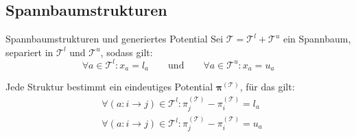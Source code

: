 \documentclass[accentcolor = tud11b, colorbacktitle, landscape, german, presentation, tudmathserif]{tudbeamer}
\renewcommand{\vec}[1]{\boldsymbol{\mathbf{#1}}}
\begin{document}
		\subsection{Spannbaumstrukturen}
			\begin{frame}{Spannbaumstrukturen und generiertes Potential}
				Sei \( \mathcal{T} = \mathcal{T}^l + \mathcal{T}^u \) ein Spannbaum, separiert in \( \mathcal{T}^l \) und \( \mathcal{T}^u \), sodass gilt:
				\begin{equation*}
					\forall a \in \mathcal{T}^l : x_a = l_a \qquad\text{und}\qquad \forall a \in \mathcal{T}^u : x_a = u_a
				\end{equation*}
				
				\vspace{0.5cm}
				Jede Struktur bestimmt ein eindeutiges Potential \( \vec{\pi}^{(\mathcal{T})} \), für das gilt:
				\begin{align*}
					& \forall (a : i \to j) \in \mathcal{T}^l : \pi^{(\mathcal{T})}_j - \pi^{(\mathcal{T})}_i = l_a \\
					& \forall (a : i \to j) \in \mathcal{T}^l : \pi^{(\mathcal{T})}_j - \pi^{(\mathcal{T})}_i = u_a
				\end{align*}
			\end{frame}
		
\end{document}
